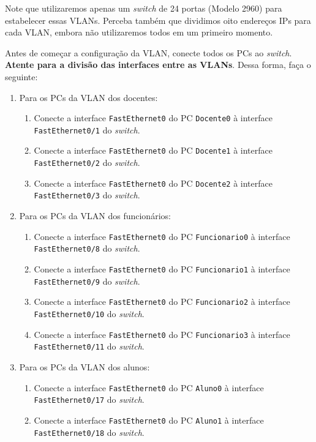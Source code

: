 Note que utilizaremos apenas um \textit{switch} de 24 portas (Modelo 2960) para estabelecer essas VLANs. Perceba também que dividimos oito endereços IPs para cada VLAN, embora não utilizaremos todos em um primeiro momento.

Antes de começar a configuração da VLAN, conecte todos os PCs ao \textit{switch}. \textbf{Atente para a divisão das 
interfaces entre as VLANs}. Dessa forma, faça o seguinte:
\begin{enumerate}[label*=\arabic*.]\label{enum:divInterfaces}
\item Para os PCs da VLAN dos docentes:
   \begin{enumerate}[label*=\arabic*.]
       \item Conecte a interface \texttt{FastEthernet0} do PC \texttt{Docente0} à interface \texttt{FastEthernet0/1} do \textit{switch}.
       \item Conecte a interface \texttt{FastEthernet0} do PC \texttt{Docente1} à interface \texttt{FastEthernet0/2} do \textit{switch}.
       \item Conecte a interface \texttt{FastEthernet0} do PC \texttt{Docente2} à interface \texttt{FastEthernet0/3} do \textit{switch}.
   \end{enumerate}
\item Para os PCs da VLAN dos funcionários:
   \begin{enumerate}[label*=\arabic*.]
       \item Conecte a interface \texttt{FastEthernet0} do PC \texttt{Funcionario0} à interface \texttt{Fast\-Ether\-net0/8} do \textit{switch}.
       \item Conecte a interface \texttt{FastEthernet0} do PC \texttt{Funcionario1} à interface \texttt{Fast\-Ether\-net0/9} do \textit{switch}.
       \item Conecte a interface \texttt{FastEthernet0} do PC \texttt{Funcionario2} à interface \texttt{Fast\-Ether\-net0/10} do \textit{switch}.
       \item Conecte a interface \texttt{FastEthernet0} do PC \texttt{Funcionario3} à interface \texttt{Fast\-Ether\-net0/11} do \textit{switch}.
   \end{enumerate}
\item Para os PCs da VLAN dos alunos:
   \begin{enumerate}[label*=\arabic*.]
       \item Conecte a interface \texttt{FastEthernet0} do PC \texttt{Aluno0} à interface \texttt{FastEthernet0/17} do \textit{switch}.
       \item Conecte a interface \texttt{FastEthernet0} do PC \texttt{Aluno1} à interface \texttt{FastEthernet0/18} do \textit{switch}.

\end{enumerate}
\end{enumerate}

